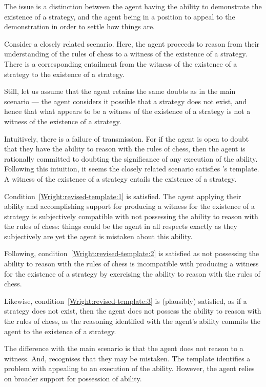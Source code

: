 \documentclass[10pt]{article}
\begin{document}
\begin{note}
  The issue is a distinction between the agent having the ability to demonstrate the existence of a strategy, and the agent being in a position to appeal to the demonstration in order to settle how things are.

  Consider a closely related scenario.
  Here, the agent proceeds to reason from their understanding of the rules of chess to a witness of the existence of a strategy.
  There is a corresponding entailment from the witness of the existence of a strategy to the existence of a strategy.

  Still, let us assume that the agent retains the same doubts as in the main scenario --- the agent considers it possible that a strategy does not exist, and hence that what appears to be a witness of the existence of a strategy is not a witness of the existence of a strategy.

  Intuitively, there is a failure of transmission.
  For if the agent is open to doubt that they have the ability to reason with the rules of chess, then the agent is rationally committed to doubting the significance of any execution of the ability.
  Following this intuition, it seems the closely related scenario satisfies \citeauthor{Wright:2011wn}'s template.
  A witness of the existence of a strategy entails the existence of a strategy.

  Condition~\ref{Wright:revised-template:1} is satisfied.
  The agent applying their ability and accomplishing support for producing a witness for the existence of a strategy is subjectively compatible with not possessing the ability to reason with the rules of chess: things could be the agent in all respects exactly as they subjectively are yet the agent is mistaken about this ability.

  Following, condition~\ref{Wright:revised-template:2} is satisfied as not possessing the ability to reason with the rules of chess is incompatible with producing a witness for the existence of a strategy by exercising the ability to reason with the rules of chess.

  Likewise, condition~\ref{Wright:revised-template:3} is (plausibly) satisfied, as if a strategy does not exist, then the agent does not possess the ability to reason with the rules of chess, as the reasoning identified with the agent's ability commits the agent to the existence of a strategy.

  The difference with the main scenario is that the agent does not reason to a witness.
  And, recognises that they may be mistaken.
  The template identifies a problem with appealing to an execution of the ability.
  However, the agent relies on broader support for possession of ability.


\end{note}
\end{document}
